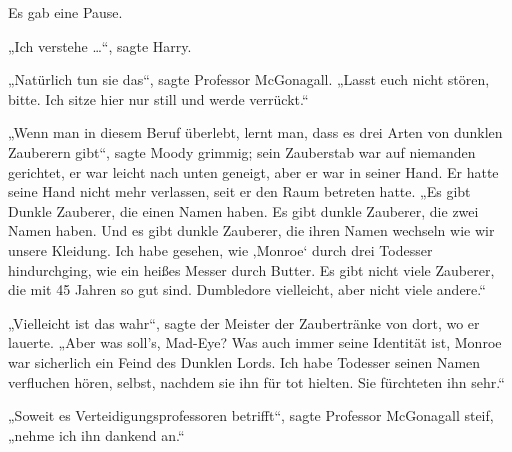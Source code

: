 Es gab eine Pause.

„Ich verstehe …“, sagte Harry.

„Natürlich tun sie das“, sagte Professor McGonagall.
„Lasst euch nicht stören, bitte. Ich sitze hier nur still und werde verrückt.“

„Wenn man in diesem Beruf überlebt, lernt man, dass es drei Arten von dunklen Zauberern gibt“, sagte Moody grimmig; sein Zauberstab war auf niemanden gerichtet, er war leicht nach unten geneigt, aber er war in seiner Hand. Er hatte seine Hand nicht mehr verlassen, seit er den Raum betreten hatte.
„Es gibt Dunkle Zauberer, die einen Namen haben. Es gibt dunkle Zauberer, die zwei Namen haben. Und es gibt dunkle Zauberer, die ihren Namen wechseln wie wir unsere Kleidung. Ich habe gesehen, wie ‚Monroe‘ durch drei Todesser hindurchging, wie ein heißes Messer durch Butter. Es gibt nicht viele Zauberer, die mit 45 Jahren so gut sind. Dumbledore vielleicht, aber nicht viele andere.“

„Vielleicht ist das wahr“, sagte der Meister der Zaubertränke von dort, wo er lauerte.
„Aber was soll’s, Mad-Eye? Was auch immer seine Identität ist, Monroe war sicherlich ein Feind des Dunklen Lords. Ich habe Todesser seinen Namen verfluchen hören, selbst, nachdem sie ihn für tot hielten. Sie fürchteten ihn sehr.“

„Soweit es Verteidigungsprofessoren betrifft“, sagte Professor McGonagall steif, „nehme ich ihn dankend an.“


